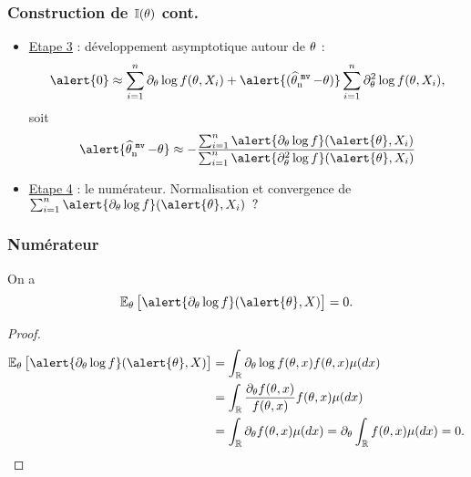 \begin{frame}
\frametitle{Construction de $\mathbb{I}(\theta)$ cont.}
\begin{itemize}
\item \underline{Etape 3} : développement asymptotique \alert{autour de $\theta$} :
$$\alert{0}  \approx \sum_{i = 1}^n \partial_\truetheta \log f(\truetheta, X_i) + \alert{(\estMV-\truetheta)} \sum_{i = 1}^n \partial^2_\truetheta \log f(\truetheta, X_i),$$
soit
$$\alert{\estMV-\truetheta} \approx -\frac{\sum_{i = 1}^n \alert{\partial_\truetheta \log f}(\alert{\truetheta}, X_i)}{ \sum_{i = 1}^n \alert{\partial^2_\truetheta \log f}(\alert{\truetheta}, X_i)}$$
\item \underline{Etape 4} : le numérateur. Normalisation et convergence de
$\sum_{i = 1}^n \alert{\partial_\truetheta \log f}(\alert{\truetheta}, X_i)\;\;?$
\end{itemize}
\end{frame}

\begin{frame}
\frametitle{Numérateur}
\begin{lem}
On a $$\E_\truetheta\big[\alert{\partial_\truetheta \log f}(\alert{\truetheta}, X)\big]=0.$$
\end{lem}
\pause
\begin{proof}
\begin{align*}
\E_\truetheta\big[\alert{\partial_\truetheta \log f}(\alert{\truetheta}, X)\big] & = \int_{\R} \partial_\truetheta \log f(\truetheta, x) f(\truetheta, x)\mu(dx) \\
& = \int_{\R} \frac{\partial_\truetheta f(\truetheta, x)}{f(\truetheta, x)} f(\truetheta, x) \mu(dx) \\
& = \int_{\R} \partial_\truetheta f(\truetheta, x) \mu(dx) = \partial_\truetheta \int_{\R} f(\truetheta, x) \mu(dx)  = 0.
\end{align*}
\end{proof}
\end{frame}

